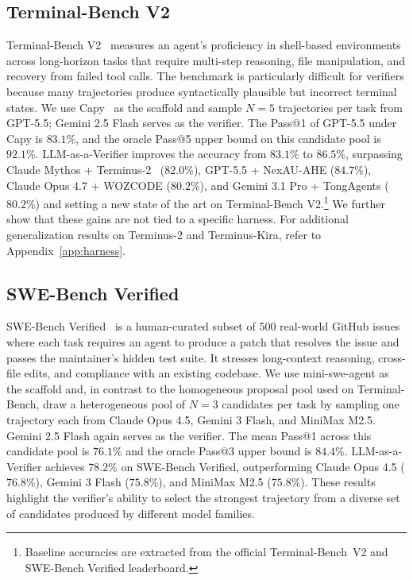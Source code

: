 \subsection{Terminal-Bench V2}
\label{sec:terminal}

Terminal-Bench V2~\citep{merrill_terminal-bench_2026} measures an agent's proficiency in shell-based environments across long-horizon tasks that require multi-step reasoning, file manipulation, and recovery from failed tool calls. The benchmark is particularly difficult for verifiers because many trajectories produce syntactically plausible but incorrect terminal states. We use Capy~\citep{capy} as the scaffold and sample $N{=}5$ trajectories per task from GPT-5.5; Gemini 2.5 Flash serves as the verifier. The Pass@1 of GPT-5.5 under Capy is $83.1\%$, and the oracle Pass@5 upper bound on this candidate pool is $92.1\%$. LLM-as-a-Verifier improves the accuracy from $83.1\%$ to $\mathbf{86.5\%}$, surpassing Claude Mythos + Terminus-2~\citep{noauthor_terminal-benchterminal_benchagentsterminus_2_nodate} ($82.0\%$), GPT-5.5 + NexAU-AHE ($84.7\%$), Claude Opus 4.7 + WOZCODE ($80.2\%$), and Gemini 3.1 Pro + TongAgents ($80.2\%$) and setting a new state of the art on Terminal-Bench V2.\footnote{Baseline accuracies are extracted from the official Terminal-Bench~V2 and SWE-Bench Verified leaderboard.} We further show that these gains are not tied to a specific harness. For additional generalization results on Terminus-2 and Terminus-Kira, refer to Appendix~\ref{app:harness}.

\subsection{SWE-Bench Verified}
\label{sec:swebench}

SWE-Bench Verified~\citep{jimenez_swe-bench_2024} is a human-curated subset of 500 real-world GitHub issues where each task requires an agent to produce a patch that resolves the issue and passes the maintainer's hidden test suite. It stresses long-context reasoning, cross-file edits, and compliance with an existing codebase. We use mini-swe-agent as the scaffold and, in contrast to the homogeneous proposal pool used on Terminal-Bench, draw a heterogeneous pool of $N{=}3$ candidates per task by sampling one trajectory each from Claude Opus 4.5, Gemini 3 Flash, and MiniMax M2.5. Gemini 2.5 Flash again serves as the verifier. The mean Pass@1 across this candidate pool is $76.1\%$ and the oracle Pass@3 upper bound is $84.4\%$. LLM-as-a-Verifier achieves $\mathbf{78.2\%}$ on SWE-Bench Verified, outperforming Claude Opus 4.5 ($76.8\%$), Gemini 3 Flash ($75.8\%$), and MiniMax M2.5 ($75.8\%$). These results highlight the verifier's ability to select the strongest trajectory from a diverse set of candidates produced by different model families.

